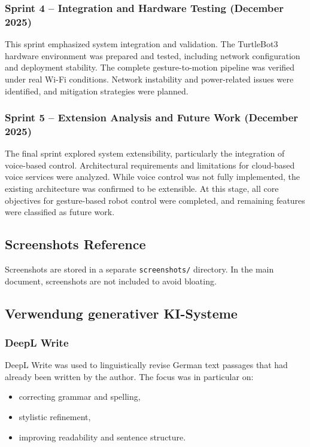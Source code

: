 \documentclass[11pt,a4paper]{article}
\begin{document}
\subsubsection{Sprint 4 -- Integration and Hardware Testing (December 2025)}
This sprint emphasized system integration and validation. The TurtleBot3 hardware environment was prepared and tested, including network configuration and deployment stability. The complete gesture-to-motion pipeline was verified under real Wi-Fi conditions. Network instability and power-related issues were identified, and mitigation strategies were planned.

\subsubsection{Sprint 5 -- Extension Analysis and Future Work (December 2025)}
The final sprint explored system extensibility, particularly the integration of voice-based control. Architectural requirements and limitations for cloud-based voice services were analyzed. While voice control was not fully implemented, the existing architecture was confirmed to be extensible. At this stage, all core objectives for gesture-based robot control were completed, and remaining features were classified as future work.


\subsection{Screenshots Reference}
Screenshots are stored in a separate \texttt{screenshots/} directory.
In the main document, screenshots are not included to avoid bloating.



\newpage
\subsection{Verwendung generativer KI-Systeme}
\subsubsection{DeepL Write}

DeepL Write was used to linguistically revise German text passages that had already been written by the author. The focus was in particular on:
\begin{itemize}
	\item correcting grammar and spelling,
	\item stylistic refinement,
	\item improving readability and sentence structure.
\end{itemize}
\end{document}
